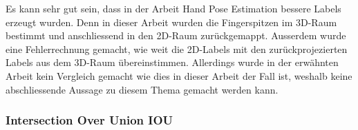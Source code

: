 Es kann sehr gut sein, dass in der Arbeit \grqq{}Hand Pose Estimation\grqq{} \cite{HandPoseEstimation} bessere Labels erzeugt wurden.
Denn in dieser Arbeit\cite{HandPoseEstimation} wurden die Fingerspitzen im 3D-Raum bestimmt und anschliessend in den 2D-Raum zurückgemappt.
Ausserdem wurde eine Fehlerrechnung gemacht, wie weit die 2D-Labels mit den zurückprojezierten Labels aus dem 3D-Raum übereinstimmen. 
Allerdings wurde in der erwähnten Arbeit\cite{HandPoseEstimation} kein Vergleich gemacht wie dies in dieser Arbeit der Fall ist, weshalb keine abschliessende Aussage zu diesem Thema gemacht werden kann.

\subsubsection{Intersection Over Union IOU}

